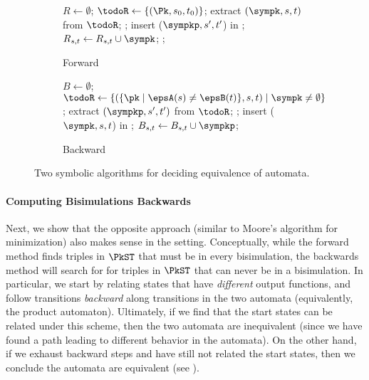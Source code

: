 \begin{figure} \small
\begin{subfigure}[t]{.49\linewidth}
\begin{algorithmic}
\State $R\gets \emptyset$;
\State $\todoR \gets \{(\Pk,s_0,t_0)\}$;
    \State extract $(\sympk, s,t)$ from $\todoR$;
        \State \Return \false;
	\EndIf
        \If {$\sympkp \neq \emptyset$}
     	    \State insert ($\sympkp, s', t'$) in \todoR;
        \EndIf
      \EndFor
     \State $R_{s,t} \gets R_{s,t} \cup \sympk$;
    \EndIf
\EndWhile
\State
\Return \true;
\end{algorithmic}
\caption{Forward}
\label{fig:fwd-sym}

\end{subfigure}
\begin{subfigure}[t]{.49\linewidth}
\begin{algorithmic}
\State $B \gets \emptyset$;
  \State $\todoR \gets \{ (\{\pk \mid \epsA(s) \neq \epsB(t)\}, s, t) \mid \sympk \neq \emptyset\}$;
    \State extract $(\sympkp, s', t')$ from $\todoR$;
            \State \Return \false;
        \EndIf
          \If {$\sympk \neq \emptyset$}
            \State insert ($\sympk, s, t$) in \todoR;
          \EndIf
        \EndFor
        \State $B_{s,t} \gets B_{s,t} \cup \sympkp$;
    \EndIf
\EndWhile
\Return \true
\end{algorithmic}
\caption{Backward}\label{fig:bkwd-alg}
\end{subfigure}

\caption {Two symbolic algorithms for deciding equivalence of \NetKAT
automata.}\label{fig:pseudocode}
\end{figure}

\paragraph*{Computing Bisimulations Backwards}

Next, we show that the opposite approach (similar to Moore's algorithm
for minimization) also makes sense in the \NetKAT
setting. Conceptually, while the forward method finds triples in
$\PkST$ that must be in every bisimulation, the backwards method will
search for for triples in $\PkST$ that can never be in a
bisimulation. In particular, we start by relating states that have
\emph{different} output functions, and follow transitions
\emph{backward} along transitions in the two automata (equivalently,
the product automaton). Ultimately, if we find that the start states
can be related under this scheme, then the two automata are
inequivalent (since we have found a path leading to different behavior
in the automata). On the other hand, if we exhaust backward steps and
have still not related the start states, then we conclude the automata
are equivalent (see ).



